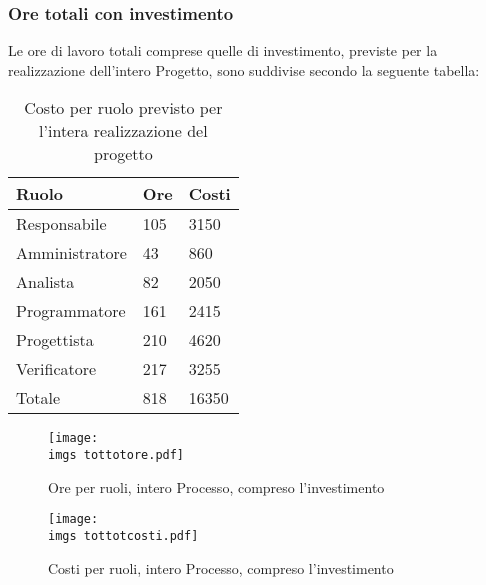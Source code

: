 {{	\subsubsection{Ore totali con investimento}{
		Le ore di lavoro totali comprese quelle di investimento, previste per la realizzazione dell’intero Progetto, sono suddivise secondo la seguente tabella:
		\begin{table}[H]
			 \centering
			 \begin{tabular}{p{}p{}
			  	  		  				p{}}
				  \toprule Ruolo & Ore  & Costi \\
				  \midrule
				  Responsabile & 105  & 3150 \\
				  Amministratore & 43  & 860 \\
				  Analista & 82  & 2050 \\
				  Programmatore & 161  & 2415 \\
				  Progettista & 210  & 4620 \\
				  Verificatore & 217  & 3255 \\
				  Totale & 818  & 16350 \\
				  \bottomrule
			 \end{tabular}
			 \label{tab:costoinvestimento}
			 \caption{Costo per ruolo previsto per l’intera realizzazione del progetto}
		\end{table}
		
		\begin{figure}[H]
			\centering
			\texttt{[image: \\imgs tottotore.pdf]}
			\label{fig:oreinvestimento}
			\caption{Ore per ruoli, intero Processo, compreso l’investimento}
		\end{figure}
		\begin{figure}[H]
			\centering
			\texttt{[image: \\imgs tottotcosti.pdf]}
			\label{fig:costoinvestimento}
			\caption{Costi per ruoli, intero Processo, compreso l’investimento}
		\end{figure}
	}
}}
